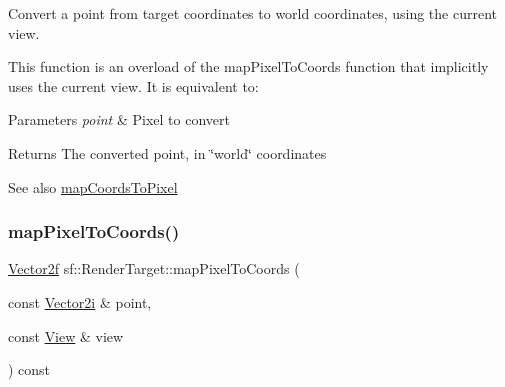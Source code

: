 Convert a point from target coordinates to world coordinates, using the current view. 

This function is an overload of the map\+Pixel\+To\+Coords function that implicitly uses the current view. It is equivalent to\+: 
\begin{DoxyCode}{0}
\end{DoxyCode}



\begin{DoxyParams}{Parameters}
{\em point} & Pixel to convert\\
\hline
\end{DoxyParams}
\begin{DoxyReturn}{Returns}
The converted point, in \char`\"{}world\char`\"{} coordinates
\end{DoxyReturn}
\begin{DoxySeeAlso}{See also}
\mbox{\hyperlink{classsf_1_1_render_target_ad92a9f0283aa5f3f67e473c1105b68cf}{map\+Coords\+To\+Pixel}} \begin{DoxyVerb}\end{DoxyVerb}
 
\end{DoxySeeAlso}
\mbox{\label{classsf_1_1_render_target_a2d3e9d7c4a1f5ea7e52b06f53e3011f9}} 
\subsubsection{\texorpdfstring{mapPixelToCoords()}{mapPixelToCoords()}\hspace{0.1cm}{\footnotesize\ttfamily [2/2]}}
{\footnotesize\ttfamily \mbox{\hyperlink{classsf_1_1_vector2}{Vector2f}} sf\+::\+Render\+Target\+::map\+Pixel\+To\+Coords (\begin{DoxyParamCaption}\item[{const \mbox{\hyperlink{classsf_1_1_vector2}{Vector2i}} \&}]{point,  }\item[{const \mbox{\hyperlink{classsf_1_1_view}{View}} \&}]{view }\end{DoxyParamCaption}) const}



